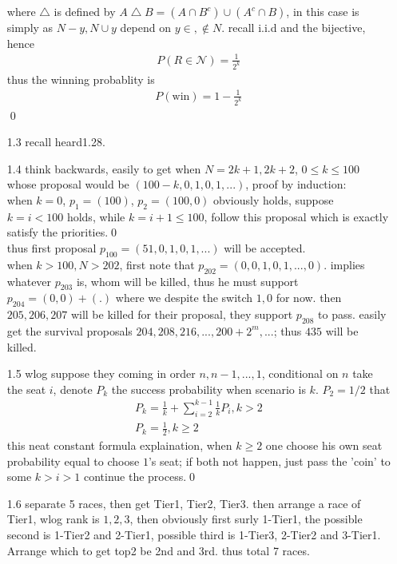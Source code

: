 \documentclass[paper=a4, fontsize=11pt]{scrartcl} %
\numberwithin{equation}{section} %
\numberwithin{figure}{section} %
\numberwithin{table}{section} %
\begin{document}
\begin{itemize}
	where $\bigtriangleup$ is defined by $A\bigtriangleup B = (A\cap B^c)\cup (A^c\cap B)$, in this case is simply as $N-y,N\cup y$ depend on $y\in,\notin N$. recall i.i.d and the bijective, hence
	\begin{align}
		P(R\in \mathcal{N}) = \frac{1}{2^k}
	\end{align}
	thus the winning probablity is
	\begin{align}
		P(\text{win}) = 1 - \frac{1}{2^k}
	\end{align}\qed
	\item[1.3] recall heard1.28.
	\item[1.4] think backwards, easily to get when $N=2k+1,2k+2$, $0\leq k\leq 100$ whose proposal would be $(100-k,0,1,0,1,...)$, proof by induction:\\
	when $k=0$, $p_1=(100)$, $p_2=(100,0)$ obviously holds, suppose $k=i<100$ holds, while $k=i+1\leq 100$, follow this proposal which is exactly satisfy the priorities.\qed\\
	thus first proposal $p_{100} = (51,0,1,0,1,...)$ will be accepted.\\
	when $k>100, N>202$, first note that $p_{202} = (0,0,1,0,1,...,0)$. implies whatever $p_{203}$ is, whom will be killed, thus he must support $p_{204}=(0,0)+(.)$ where we despite the switch $1,0$ for now. then $205,206,207$ will be killed for their proposal, they support $p_{208}$ to pass. easily get the survival proposals $204,208,216,...,200+2^m,...$; thus $435$ will be killed.
	 \item[1.5] wlog suppose they coming in order $n,n-1,...,1$, conditional on $n$ take the seat $i$, denote $P_k$ the success probability when scenario is $k$. $P_2=1/2$ that
	 \begin{align}
	 	P_k = \frac{1}{k}+ \sum_{i=2}^{k-1} \frac{1}{k} P_i, k>2\\
	 	P_k = \frac{1}{2}, k\geq 2
	 \end{align}
	 this neat constant formula explaination, when $k\geq 2$ one choose his own seat probability equal to choose $1$'s seat; if both not happen, just pass the 'coin' to some $k>i>1$ continue the process.\qed
	 \item[1.6] separate 5 races, then get Tier1, Tier2, Tier3. then arrange a race of Tier1, wlog rank is $1,2,3$, then obviously first surly 1-Tier1, the possible second is 1-Tier2 and 2-Tier1, possible third is 1-Tier3, 2-Tier2 and 3-Tier1. Arrange which to get top2 be 2nd and 3rd. thus total 7 races.

\end{itemize}
\end{document}
